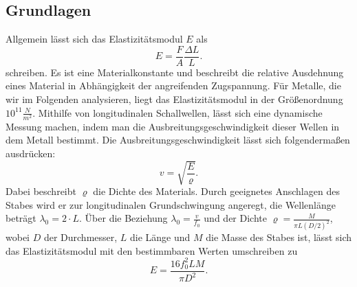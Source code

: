 \documentclass[a4paper, 11pt]{article}
\begin{document}
\subsection{Grundlagen}
Allgemein lässt sich das Elastizitätsmodul $E$ als
\begin{equation}
E = \frac{F}{A} \frac{\Delta L}{L}.
\end{equation}
schreiben. Es ist eine Materialkonstante und beschreibt die relative Ausdehnung eines Material in Abhängigkeit der angreifenden Zugspannung. Für Metalle, die wir im Folgenden analysieren, liegt das Elastizitätsmodul in der Größenordnung $10^{11} \frac{N}{m^2}$.
Mithilfe von longitudinalen Schallwellen, lässt sich eine dynamische Messung machen, indem man die Ausbreitungsgeschwindigkeit dieser Wellen in dem Metall bestimmt. Die Ausbreitungsgeschwindigkeit lässt sich folgendermaßen ausdrücken: 
\begin{equation}
v = \sqrt{ \frac{E}{\varrho}}.
\end{equation}
Dabei beschreibt $\varrho$ die Dichte des Materials. Durch geeignetes Anschlagen des Stabes wird er zur longitudinalen Grundschwingung angeregt, die Wellenlänge beträgt $\lambda_0 = 2 \cdot L$. Über die Beziehung $\lambda_0 = \frac{v}{f_0}$ und der Dichte $\varrho = \frac{M}{\pi L (D/2)^2}$, wobei $D$ der Durchmesser, $L$ die Länge und $M$ die Masse des Stabes ist, lässt sich das Elastizitätsmodul mit den bestimmbaren Werten umschreiben zu
\begin{equation}\label{eq:Emodul}
E = \frac{16 f_0^2 L M}{\pi D^2}.
\end{equation}
\end{document}
